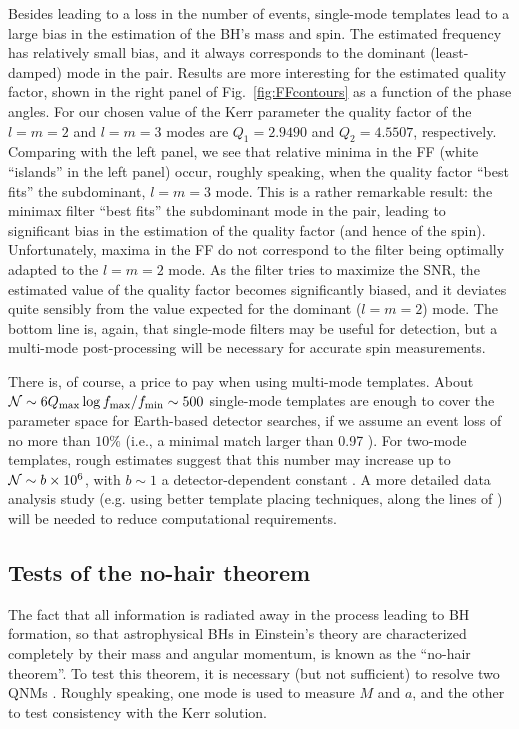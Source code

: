 \documentclass[]{iopart}
\begin{document}
Besides leading to a loss in the number of events, single-mode templates lead
to a large bias in the estimation of the BH's mass and spin.  The estimated
frequency has relatively small bias, and it always corresponds to the dominant
(least-damped) mode in the pair. Results are more interesting for the
estimated quality factor, shown in the right panel of
Fig.~\ref{fig:FFcontours} as a function of the phase angles. For our chosen
value of the Kerr parameter the quality factor of the $l=m=2$ and $l=m=3$
modes are $Q_1 = 2.9490$ and $Q_2 = 4.5507$, respectively. Comparing with the
left panel, we see that relative minima in the FF (white ``islands'' in the
left panel) occur, roughly speaking, when the quality factor ``best fits'' the
subdominant, $l=m=3$ mode. This is a rather remarkable result: the minimax
filter ``best fits'' the subdominant mode in the pair, leading to significant
bias in the estimation of the quality factor (and hence of the
spin). Unfortunately, maxima in the FF do not correspond to the filter being
optimally adapted to the $l=m=2$ mode. As the filter tries to maximize the
SNR, the estimated value of the quality factor becomes significantly biased,
and it deviates quite sensibly from the value expected for the dominant
($l=m=2$) mode. The bottom line is, again, that single-mode filters may be
useful for detection, but a multi-mode post-processing will be necessary for
accurate spin measurements.

There is, of course, a price to pay when using multi-mode templates.  About
${\cal N}\sim 6Q_{\rm max} \log{f_{\rm max}/f_{\rm min}}\sim 500$ single-mode
templates are enough to cover the parameter space for Earth-based detector
searches, if we assume an event loss of no more than $10\%$ (i.e., a minimal
match larger than 0.97 \cite{Owen:1995tm}). For two-mode templates, rough
estimates suggest that this number may increase up to ${\cal N} \sim b\times
10^6$, with $b\sim 1$ a detector-dependent constant \cite{Berti:2007zu}. A
more detailed data analysis study (e.g. using better template placing
techniques, along the lines of
\cite{Nakano:2003ma,Nakano:2004ib,Tsunesada:2004ft,Tsunesada:2005fe}) will be
needed to reduce computational requirements.

\subsection{\label{sec:nohair}Tests of the no-hair theorem}
The fact that all information is radiated away in the process leading to BH
formation, so that astrophysical BHs in Einstein's theory are characterized
completely by their mass and angular momentum, is known as the ``no-hair
theorem''. To test this theorem, it is necessary (but not sufficient) to
resolve two QNMs \cite{Berti:2005ys,Dreyer:2003bv}. Roughly speaking, one mode
is used to measure $M$ and $a$, and the other to test consistency with the
Kerr solution.  
\end{document}
